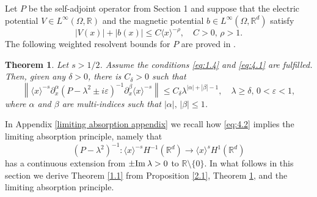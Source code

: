\documentclass[11pt]{amsart}
\newtheorem{Theorem}{Theorem}[section]
\numberwithin{equation}{section}
\def\R{{\mathbb R}}
\def\Im{{\rm Im}\:}
\begin{document}
Let $P$ be the self-adjoint operator from Section 1 and suppose that the electric potential $V\in L^\infty(\Omega,\mathbb{R})$
and the magnetic potential 
$b\in L^\infty(\Omega,\mathbb{R}^d)$ satisfy
\begin{equation}\label{eq:4.1}
|V(x)|+|b(x)|\le C\langle x\rangle^{-\rho}, \quad C>0,\,\rho>1.
\end{equation}
The following weighted resolvent bounds for $P$ are proved in \cite{kn:LSV}.

\begin{Theorem} \label{4.1}
Let $s > 1/2$. Assume the conditions \eqref{eq:1.4} and \eqref{eq:4.1} are fulfilled. Then, given any $\delta>0$, there is $C_\delta>0$ such that 
\begin{equation}\label{eq:4.2}
\left\|\langle x\rangle^{-s}\partial_x^\alpha(P-\lambda^2\pm i\varepsilon)^{-1}\partial_x^\beta\langle x\rangle^{-s}\right\|
\le C_\delta\lambda^{|\alpha|+|\beta|-1},\quad\lambda\ge\delta,\,0<\varepsilon<1,
\end{equation}
where $\alpha$ and $\beta$ are multi-indices such that $|\alpha|, \, |\beta| \le 1$.  
\end{Theorem}

In Appendix \ref{limiting absorption appendix} we recall how \eqref{eq:4.2} implies the limiting absorption principle, namely that  
\begin{equation*}
(P-\lambda^2)^{-1} : \langle x\rangle^{-s}H^{-1}(\mathbb{R}^d)\to \langle x\rangle^{s}H^1(\mathbb{R}^d)
\end{equation*}
has a continuous extension from $\pm \Im \lambda > 0$ to $\R \setminus \{0\}$. In what follows in this section we derive Theorem \ref{1.1} from Proposition \ref{2.1}, Theorem \ref{4.1}, and the limiting absorption principle.
\end{document}
